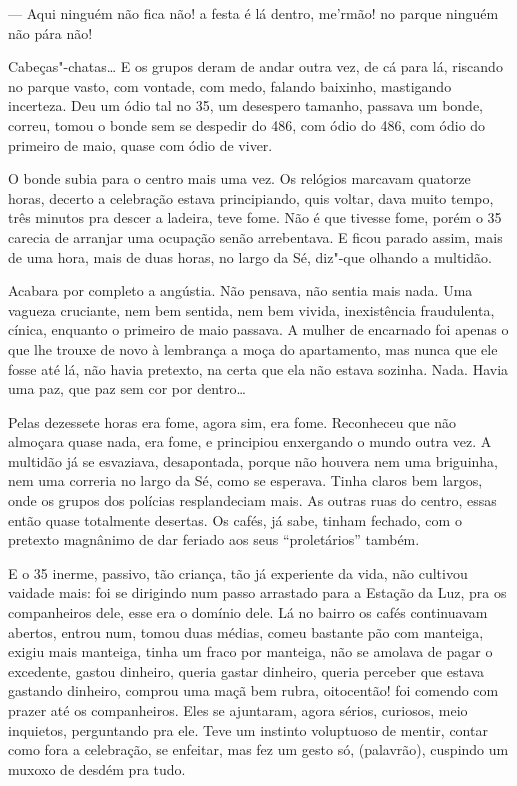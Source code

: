 \begin{linenumbers}
--- Aqui ninguém não fica não! a festa é lá dentro, me'rmão! no parque
ninguém não pára não!

Cabeças"-chatas\ldots{} E os grupos deram de andar outra vez, de cá para lá,
riscando no parque vasto, com vontade, com medo, falando baixinho,
mastigando incerteza. Deu um ódio tal no 35, um desespero tamanho,
passava um bonde, correu, tomou o bonde sem se despedir do 486, com ódio
do 486, com ódio do primeiro de maio, quase com ódio de viver.

O bonde subia para o centro mais uma vez. Os relógios marcavam quatorze
horas, decerto a celebração estava principiando, quis voltar, dava muito
tempo, três minutos pra descer a ladeira, teve fome. Não é que tivesse
fome, porém o 35 carecia de arranjar uma ocupação senão arrebentava. E
ficou parado assim, mais de uma hora, mais de duas horas, no largo da
Sé, diz"-que olhando a multidão.

Acabara por completo a angústia. Não pensava, não sentia mais nada. Uma
vagueza cruciante, nem bem sentida, nem bem vivida, inexistência
fraudulenta, cínica, enquanto o primeiro de maio passava. A mulher de
encarnado foi apenas o que lhe trouxe de novo à lembrança a moça do
apartamento, mas nunca que ele fosse até lá, não havia pretexto, na
certa que ela não estava sozinha. Nada. Havia uma paz, que paz sem cor
por dentro\ldots{}

Pelas dezessete horas era fome, agora sim, era fome. Reconheceu que não
almoçara quase nada, era fome, e principiou enxergando o mundo outra
vez. A multidão já se esvaziava, desapontada, porque não houvera nem uma
briguinha, nem uma correria no largo da Sé, como se esperava. Tinha
claros bem largos, onde os grupos dos polícias resplandeciam mais. As
outras ruas do centro, essas então quase totalmente desertas. Os cafés,
já sabe, tinham fechado, com o pretexto magnânimo de dar feriado aos
seus ``proletários'' também.

E o 35 inerme, passivo, tão criança, tão já experiente da vida, não
cultivou vaidade mais: foi se dirigindo num passo arrastado para a
Estação da Luz, pra os companheiros dele, esse era o domínio dele. Lá no
bairro os cafés continuavam abertos, entrou num, tomou duas médias,
comeu bastante pão com manteiga, exigiu mais manteiga, tinha um fraco
por manteiga, não se amolava de pagar o excedente, gastou dinheiro,
queria gastar dinheiro, queria perceber que estava gastando dinheiro,
comprou uma maçã bem rubra, oitocentão! foi comendo com prazer até os
companheiros. Eles se ajuntaram, agora sérios, curiosos, meio inquietos,
perguntando pra ele. Teve um instinto voluptuoso de mentir, contar como
fora a celebração, se enfeitar, mas fez um gesto só, (palavrão),
cuspindo um muxoxo de desdém pra tudo.


\end{linenumbers}
